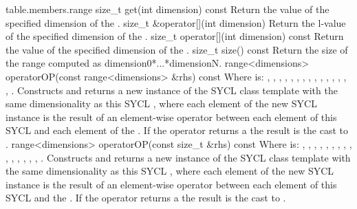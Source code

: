 {table.members.range}
  \addRow
    {size_t get(int dimension) const}
    {
        Return the value of the specified dimension of the
        .
    }
  \addRow
    {size_t \&operator[](int dimension)}
    {
        Return the l-value of the specified dimension of the
        .
    }
  \addRow
    {size_t operator[](int dimension) const}
    {
        Return the value of the specified dimension of the
        .
    }
  \addRow
    {size_t size() const}
    {
        Return the size of the range computed as dimension0*...*dimensionN.
    }
  \addRow
    { range<dimensions> operatorOP(const range<dimensions> \&rhs) const }
    {
      Where  is: \codeinline{+}, \codeinline{-}, \codeinline{*},
      \codeinline{/}, \codeinline{\%}, \codeinline{<<}, \codeinline{>>},
      \codeinline{\&}, \codeinline{|}, \codeinline{^}, \codeinline{\&\&},
      \codeinline{||}, \codeinline{<}, \codeinline{>}, \codeinline{<=},
      \codeinline{>=}.
      \newline
      Constructs and returns a new instance of the SYCL  class
      template with the same dimensionality as this SYCL ,
      where each element of the new SYCL  instance is the
      result of an element-wise  operator between each element of
      this SYCL  and each element of the 
      . If the operator returns a  the result
      is the cast to .
    }
  \addRow
    { range<dimensions> operatorOP(const size_t \&rhs) const }
    {
      Where  is: \codeinline{+}, \codeinline{-}, \codeinline{*},
      \codeinline{/}, \codeinline{\%}, \codeinline{<<}, \codeinline{>>},
      \codeinline{\&}, \codeinline{|}, \codeinline{^}, \codeinline{\&\&},
      \codeinline{||}, \codeinline{<}, \codeinline{>}, \codeinline{<=},
      \codeinline{>=}.
      \newline
      Constructs and returns a new instance of the SYCL  class
      template with the same dimensionality as this SYCL ,
      where each element of the new SYCL  instance is the result
      of an element-wise  operator between each element of this
      SYCL  and the  . If
      the operator returns a  the result is the cast to
      .
    }
